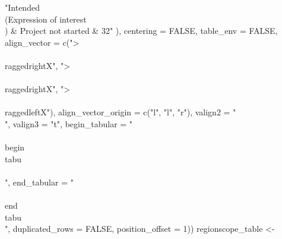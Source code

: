     "Intended \\(Expression of interest\\) & Project not started & 32"
    ), centering = FALSE, table_env = FALSE, align_vector = c(">{\\\\raggedright}X", 
    ">{\\\\raggedright}X", ">{\\\\raggedleft}X"), align_vector_origin = c("l", 
    "l", "r"), valign2 = "\\[t\\]", valign3 = "t", begin_tabular = "\\\\begin\\{tabu\\}\\[t\\]", 
    end_tabular = "\\\\end\\{tabu\\}", duplicated_rows = FALSE, 
    position_offset = 1))
regionscope_table <-
